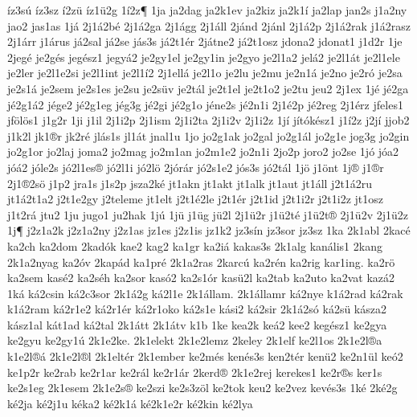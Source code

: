 {^^edz3s^^fa
^^edz3sz
^^ed2z^^fc
^^edz1^^fc2g
1^^ed2z^^b6
1ja
ja2dag
ja2k1ev
ja2kiz
ja2k1^^ed
ja2lap
jan2s
j1a2ny
jao2
jas1as
1j^^e1
2j1^^e12b^^e9
2j1^^e12ga
2j1^^e1gg
2j1^^e1ll
2j^^e1nd
2j^^e1nl
2j1^^e12p
2j1^^e12rak
j1^^e12rasz
2j1^^e1rr
j1^^e1rus
j^^e12sal
j^^e12se
j^^e1s3s
j^^e12t1^^e9r
2j^^e1tne2
j^^e12t1osz
jdona2
jdonat1
j1d2r
1je
2jeg^^e9
je2g^^e9s
jeg^^e9sz1
jegy^^e12
je2gy1el
je2gy1in
je2gyo
je2l1a2
jel^^e12
je2l1^^e1t
je2l1ele
je2ler
je2l1e2si
je2l1int
je2l1^^ed2
2j1ell^^e1
je2l1o
je2lu
je2mu
je2n1^^e1
je2no
je2r^^f3
je2sa
je2s1^^e1
je2sem
je2s1es
je2su
je2s^^fcv
je2t^^e1l
je2t1el
je2t1o2
je2tu
jeu2
2j1ex
1j^^e9
j^^e92ga
j^^e92g1^^e12
j^^e9ge2
j^^e92g1eg
j^^e9g3g
j^^e92gi
j^^e92g1o
j^^e9ne2s
j^^e92n1i
2j1^^e92p
j^^e92reg
2j1^^e9rz
jfeles1
jf^^f6l^^f6s1
j1g2r
1ji
j1il
2j1i2p
2j1ism
2j1i2ta
2j1i2v
2j1i2z
1j^^ed
j^^edt^^f3k^^e9sz1
j1^^ed2z
j2j^^ed
jjob2
j1k2l
jk1^^aer
jk2r^^e9
jl^^e1s1s
jl1^^e1t
jnal1u
1jo
jo2g1ak
jo2gal
jo2g1^^e1l
jo2g1e
jog3g
jo2gin
jo2g1or
jo2laj
joma2
jo2mag
jo2m1an
jo2m1e2
jo2n1i
2jo2p
joro2
jo2se
1j^^f3
j^^f3a2
j^^f3^^e12
j^^f3le2s
j^^f32l1es^^ae
j^^f32l1i
j^^f32l^^f6
2j^^f3r^^e1r
j^^f32s1e2
j^^f3s3s
j^^f32t^^e1l
1j^^f6
j1^^f6nt
1j^^ae
j1^^aer
2j1^^ae2s^^f6
j1p2
jra1s
j1s2p
jsza2k^^e9
jt1akn
jt1akt
jt1alk
jt1aut
jt1^^e1ll
j2t1^^e12ru
jt1^^e12t1a2
j2t1e2gy
j2teleme
jt1elt
j2t1^^e92le
j2t1^^e9r
j2t1id
j2t1i2r
j2t1i2z
jt1osz
j1t2r^^e1
jtu2
1ju
jugo1
ju2hak
1j^^fa
1j^^fc
j1^^fcg
j^^fc2l
2j1^^fc2r
j1^^fc2t^^e9
j1^^fc2t^^ae
2j1^^fc2v
2j1^^fc2z
1j^^b6
j2z1a2k
j2z1a2ny
j2z1as
jz1es
j2z1is
jz1k2
jz3s^^edn
jz3sor
jz3sz
1ka
2k1abl
2kac^^e9
ka2ch
ka2dom
2kad^^f3k
kae2
kag2
ka1gr
ka2i^^e1
kakas3s
2k1alg
kan^^e1lis1
2kang
2k1a2nyag
ka2^^f3v
2kap^^e1d
ka1pr^^e9
2k1a2ras
2karc^^fa
ka2r^^e9n
ka2rig
kar1ing.
ka2r^^f6
ka2sem
kas^^e92
ka2s^^e9h
ka2sor
kas^^f32
ka2s1^^f3r
kas^^fc2l
ka2tab
ka2uto
ka2vat
kaz^^e12
1k^^e1
k^^e12csin
k^^e12c3sor
2k1^^e12g
k^^e12l1e
2k1^^e1llam.
2k1^^e1llamr
k^^e12nye
k1^^e12rad
k^^e12rak
k1^^e12ram
k^^e12r1e2
k^^e12r1^^e9r
k^^e12r1oko
k^^e12s1e
k^^e1si2
k^^e12sir
2k1^^e12s^^f3
k^^e12s^^fc
k^^e1sza2
k^^e1sz1al
k^^e1t1ad
k^^e12tal
2k1^^e1tt
2k1^^e1tv
k1b
1ke
kea2k
ke^^e12
kee2
keg^^e9sz1
ke2gya
ke2gyu
ke2gy1^^fa
2k1e2ke.
2k1elekt
2k1e2lemz
2keley
2k1elf
ke2l1os
2k1e2l^^aea
k1e2l^^ae^^e1
2k1e2l^^ael
2k1elt^^e9r
2k1ember
ke2m^^e9s
ken^^e9s3s
ken2t^^e9r
ken^^fc2
ke2n1^^fcl
ke^^f32
ke1p2r
ke2rab
ke2r1ar
ke2r^^e1l
ke2r1^^e1r
2kerd^^ae
2k1e2rej
kerekes1
ke2r^^aes
ker1s
ke2s1eg
2k1esem
2k1e2s^^ae
ke2szi
ke2s3z^^f6l
ke2tok
keu2
ke2vez
kev^^e9s3s
1k^^e9
2k^^e92g
k^^e92ja
k^^e92j1u
k^^e9ka2
k^^e92k1^^e1
k^^e92k1e2r
k^^e92kin
k^^e92lya
}
